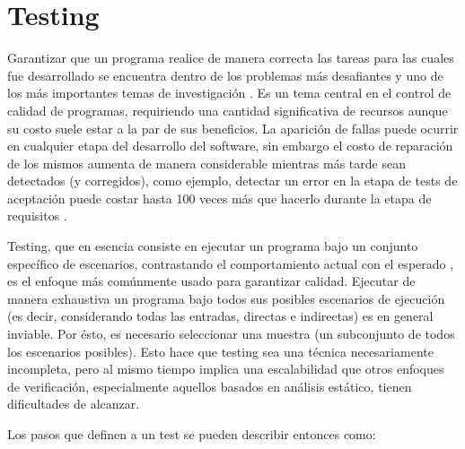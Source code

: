 \chapter[Testing]{Testing}
\label{sec:preliminares.testing}

Garantizar que un programa realice de manera correcta las tareas para las cuales fue desarrollado se encuentra dentro de los problemas m\'as desafiantes y uno de los m\'as importantes temas de investigaci\'on \cite{bibliography.books.GhezziBook,bibliography.books.PressmanBook,bibliography.books.JaloteBook}. Es un tema central en el control de calidad de programas, requiriendo una cantidad significativa de recursos \cite{bibliography.books.JaloteBook} aunque su costo suele estar a la par de sus beneficios. La aparici\'on de fallas puede ocurrir en cualquier etapa del desarrollo del software, sin embargo el costo de reparaci\'on de los mismos aumenta de manera considerable mientras m\'as tarde sean detectados (y corregidos), como ejemplo, detectar un error en la etapa de tests de aceptaci\'on puede costar hasta 100 veces m\'as que hacerlo durante la etapa de requisitos \cite{bibliography.books.JaloteBook}.

Testing, que en esencia consiste en ejecutar un programa bajo un conjunto espec\'ifico de escenarios, contrastando el comportamiento actual con el esperado \cite{bibliography.books.AmmannOffutt}, es el enfoque m\'as com\'unmente usado para garantizar calidad. Ejecutar de manera exhaustiva un programa bajo todos sus posibles escenarios de ejecuci\'on (es decir, considerando todas las entradas, directas e indirectas) es en general inviable. Por \'esto, es necesario seleccionar una muestra (un subconjunto de todos los escenarios posibles). Esto hace que testing sea una t\'ecnica necesariamente incompleta, pero al mismo tiempo implica una escalabilidad que otros enfoques de verificaci\'on, especialmente aquellos basados en an\'alisis est\'atico, tienen dificultades de alcanzar.

Los pasos que definen a un test se pueden describir entonces como:

